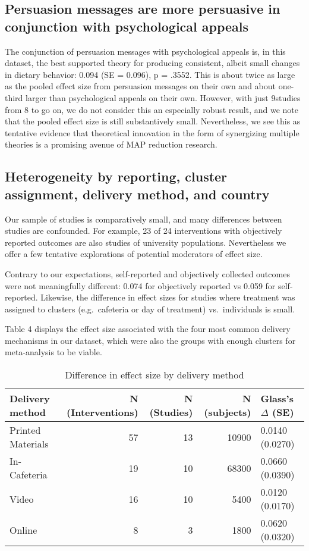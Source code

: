 \documentclass[sn-nature,referee,pdflatex]{sn-jnl}
\begin{document}
\subsection{Persuasion messages are more persuasive in conjunction with
psychological appeals}\label{sec2.10}

The conjunction of persuasion messages with psychological appeals is, in
this dataset, the best supported theory for producing consistent, albeit
small changes in dietary behavior: 0.094 (SE = 0.096), p = .3552. This
is about twice as large as the pooled effect size from persuasion
messages on their own and about one-third larger than psychological
appeals on their own. However, with just 9studies from 8 to go on, we do
not consider this an especially robust result, and we note that the
pooled effect size is still substantively small. Nevertheless, we see
this as tentative evidence that theoretical innovation in the form of
synergizing multiple theories is a promising avenue of MAP reduction
research.

\subsection{Heterogeneity by reporting, cluster assignment, delivery
method, and country}\label{sec2.11}

Our sample of studies is comparatively small, and many differences
between studies are confounded. For example, 23 of 24 interventions with
objectively reported outcomes are also studies of university
populations. Nevertheless we offer a few tentative explorations of
potential moderators of effect size.

Contrary to our expectations, self-reported and objectively collected
outcomes were not meaningfully different: 0.074 for objectively reported
vs 0.059 for self-reported. Likewise, the difference in effect sizes for
studies where treatment was assigned to clusters (e.g.~cafeteria or day
of treatment) vs.~individuals is small.

Table 4 displays the effect size associated with the four most common
delivery mechanisms in our dataset, which were also the groups with
enough clusters for meta-analysis to be viable.

\begin{table}[!h]
\centering
\caption{\label{tab:table_four}Difference in effect size by delivery method}
\centering
\begin{tabular}[t]{lrrrl}
\toprule
Delivery method & N (Interventions) & N (Studies) & N (subjects) & Glass's $\Delta$ (SE)\\
\midrule
Printed Materials & 57 & 13 & 10900 & 0.0140 (0.0270)\\
In-Cafeteria & 19 & 10 & 68300 & 0.0660 (0.0390)\\
Video & 16 & 10 & 5400 & 0.0120 (0.0170)\\
Online & 8 & 3 & 1800 & 0.0620 (0.0320)\\
\bottomrule
\end{tabular}
\end{table}
\end{document}
